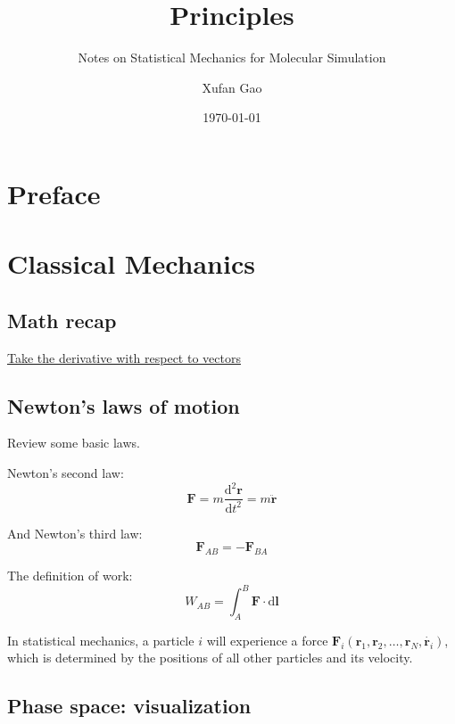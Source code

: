 \documentclass[
  10pt,
  twoside,
  openany,
  b5paper, %
  colorscheme = bootstrap-v4, %
]{qyxf-book}
\title{Principles}
\subtitle{Notes on Statistical Mechanics for Molecular Simulation}  %
\author{Xufan Gao}
\date{\today}
\numberwithin{equation}{section}
\newcommand{\md}{\mathrm{d}}
\newcommand{\dd}[2]{\dfrac{\md^2 #1}{\md #2^2}}
\newcommand{\vF}{\boldsymbol{F}}
\newcommand{\vr}{\boldsymbol{r}}
\newcommand{\vl}{\boldsymbol{l}}
\begin{document}
\maketitle

\chapter*{Preface}



\newpage

\tableofcontents



\chapter{Classical Mechanics}

\section{Math recap}

\href{https://www.cnblogs.com/yanghh/p/13756471.html}{Take the derivative with respect to vectors}

\section{Newton's laws of motion}

Review some basic laws.

Newton's second law:
\begin{equation}
	\vF=m\dd{\vr}{t}=m\ddot{\vr} \label{eq:newton2nd}
\end{equation}

And Newton's third law:
\begin{equation}
	\vF_{AB}=-\vF_{BA}
\end{equation}

The definition of work:
\begin{equation}
	W_{AB}=\int_A^B\vF\cdot\md\vl
\end{equation}

In statistical mechanics, a particle $i$ will experience a force $\vF_i(\vr_1, \vr_2,\dots, \vr_N, \dot{\vr_i})$, which is determined by the positions of all other particles and its velocity. 

\section{Phase space: visualization}
\end{document}
